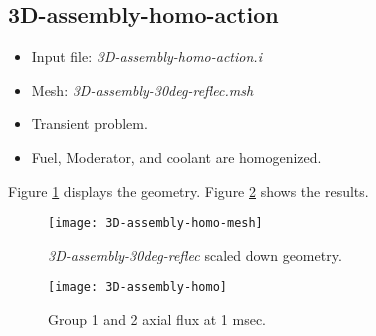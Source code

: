 \documentclass[11pt,letterpaper]{article}
\begin{document}
\subsection{3D-assembly-homo-action}

	\begin{itemize}
		\item Input file: \textit{3D-assembly-homo-action.i}
		\item Mesh: \textit{3D-assembly-30deg-reflec.msh}
		\item Transient problem.
		\item Fuel, Moderator, and coolant are homogenized.
	\end{itemize}

Figure \ref{fig:3D-assembly-homo} displays the geometry.
Figure \ref{fig:3D-assembly-homo1} shows the results.

	\begin{figure}[htbp!]
		\centering
		\texttt{[image: 3D-assembly-homo-mesh]}
		\caption{\textit{3D-assembly-30deg-reflec} scaled down geometry.}
		\label{fig:3D-assembly-homo}
	\end{figure}

	\begin{figure}[htbp!]
		\centering
		\texttt{[image: 3D-assembly-homo]}
		\caption{Group 1 and 2 axial flux at 1 msec.}
		\label{fig:3D-assembly-homo1}
	\end{figure}

\pagebreak

% 
\end{document}
